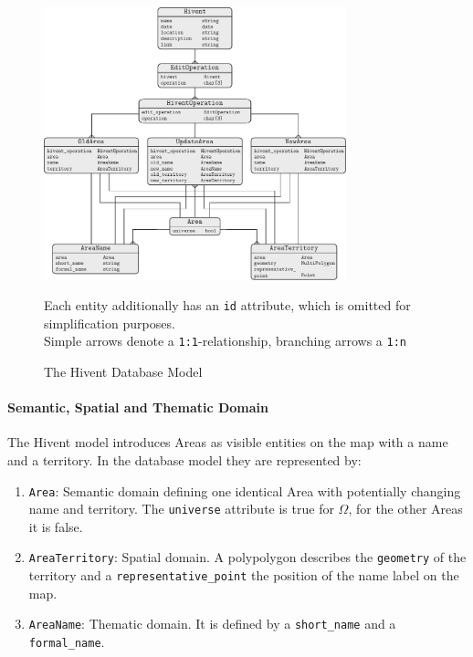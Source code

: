 \begin{figure}[ht]
  \vspace{1em}
  \centering
  \includegraphics[width=0.78\textwidth]{graphics/development/implementation/database_model}
  \caption{The Hivent Database Model}
  Each entity additionally has an \texttt{id} attribute, which is omitted for simplification purposes. \\
  Simple arrows denote a \texttt{1:1}-relationship, branching arrows a \texttt{1:n}
  \label{fig:database_model_er}
\end{figure}

\paragraph{Semantic, Spatial and Thematic Domain} %
\label{par:semantic_spatial_and_thematic_domain}

The Hivent model introduces Areas as visible entities on the map with a name and a territory. In the database model they are represented by:

\begin{enumerate}
  \item \texttt{Area}: Semantic domain defining one identical Area with potentially changing name and territory. The \texttt{universe} attribute is true for $\Omega$, for the other Areas it is false.
  \item \texttt{AreaTerritory}: Spatial domain. A polypolygon describes the \texttt{geometry} of the territory and a \texttt{representative\_point} the position of the name label on the map.
  \item \texttt{AreaName}: Thematic domain. It is defined by a \texttt{short\_name} and a \texttt{formal\_name}.
\end{enumerate}


